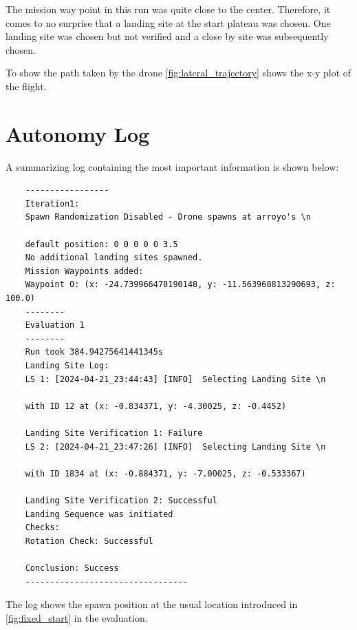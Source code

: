 The mission way point in this run was quite close to the center. Therefore, it comes to no surprise that a landing site at the start plateau was chosen. One landing site was chosen but not verified and a close by site was subsequently chosen.

To show the path taken by the drone \cref{fig:lateral_trajectory} shows the x-y plot of the flight.

\section{Autonomy Log}

A summarizing log containing the most important information is shown below:

\begin{lstlisting}
    -----------------
    Iteration1:
    Spawn Randomization Disabled - Drone spawns at arroyo's \n
    
    default position: 0 0 0 0 0 3.5
    No additional landing sites spawned.
    Mission Waypoints added:
    Waypoint 0: (x: -24.739966478190148, y: -11.563968813290693, z: 100.0)
    --------
    Evaluation 1
    --------
    Run took 384.94275641441345s
    Landing Site Log:
    LS 1: [2024-04-21_23:44:43] [INFO]  Selecting Landing Site \n
    
    with ID 12 at (x: -0.834371, y: -4.30025, z: -0.4452)

    Landing Site Verification 1: Failure
    LS 2: [2024-04-21_23:47:26] [INFO]  Selecting Landing Site \n
    
    with ID 1834 at (x: -0.884371, y: -7.00025, z: -0.533367)

    Landing Site Verification 2: Successful
    Landing Sequence was initiated
    Checks:
    Rotation Check: Successful

    Conclusion: Success
    ---------------------------------
\end{lstlisting}

The log shows the spawn position at the usual location introduced in \cref{fig:fixed_start} in the evaluation. 


